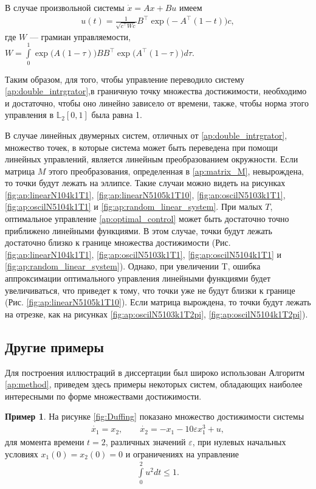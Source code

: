 \documentclass[../main.tex]{subfiles}
\begin{document}
  В случае произвольной системы $\dot{x} =Ax + Bu$ имеем
  \begin{gather}\label{ap:optimal_control}
  	u(t) = \frac{1}{\sqrt{c^{\top}Wc}} B^{\top} \operatorname{exp}\big(-A^{\top}(1-t)\big) c,
  \end{gather}
  где $W$ --- грамиан управляемости, $W  = \int\limits_{0}^{1}  \operatorname{exp}\big(A(1-\tau)\big) B B^{\top}  \operatorname{exp}\big(A^{\top}(1-\tau)\big) d\tau$.
  
  Таким образом, для того, чтобы управление переводило систему  \eqref{ap:double_intrgrator},в граничную точку множества достижимости, необходимо и достаточно, чтобы оно линейно зависело от времени, также, чтобы норма этого управления в $\mathbb{L}_2[0,1]$ была равна 1. 
  
  В случае линейных двумерных систем, отличных от  \eqref{ap:double_intrgrator}, множество точек, в которые система может быть переведена при помощи линейных управлений, является линейным преобразованием окружности.
  Если матрица $M$ этого преобразования, определенная в \eqref{ap:matrix_M}, невырождена, то точки будут лежать на эллипсе. 
  Такие случаи можно видеть на рисунках  \ref{fig:ap:linearN104k1T1}, \ref{fig:ap:linearN5105k1T10}, \ref{fig:ap:oscilN5103k1T1}, \ref{fig:ap:oscilN5104k1T1} и \ref{fig:ap:random_linear_system}.
  При малых $T$, оптимальное управление \eqref{ap:optimal_control} может быть достаточно точно приближено линейными функциями. 
  В этом случае, точки будут лежать достаточно близко к границе множества достижимости (Рис. \ref{fig:ap:linearN104k1T1}, \ref{fig:ap:oscilN5103k1T1}, \ref{fig:ap:oscilN5104k1T1} и \ref{fig:ap:random_linear_system}).
  Однако, при увеличении T, ошибка аппроксимации оптимального управления линейными функциями будет увеличиваться, что приведет к тому, что точки уже не будут близки к границе (Рис. \ref{fig:ap:linearN5105k1T10}). 
  Если матрица вырождена, то точки будут лежать на отрезке, как на рисунках \ref{fig:ap:oscilN5103k1T2pi}, \ref{fig:ap:oscilN5104k1T2pi}).
  
  \subsection{Другие примеры}
  
  Для построения иллюстраций в диссертации был широко использован Алгоритм \ref{ap:method}, приведем здесь примеры некоторых систем, обладающих наиболее интересными по форме множествами достижимости.
   
   \textbf{Пример 1}. На рисунке \ref{fig:Duffing} показано множество достижимости системы 
   \begin{gather}\label{ap:Duffing}
   	\dot{x_1} = x_2, \qquad
   	\dot{x_2} = -x_1 - 10 \varepsilon x_1^3 + u ,
   \end{gather}
   для момента времени $t = 2$, различных значений $\varepsilon$, при нулевых начальных условиях $x_1(0) = x_2(0) = 0 $ и ограничениях на управление 
   \begin{gather}\label{ap:Duffing_controls}
   	\int\limits_0^2u^2dt \leqslant 1.
   \end{gather}
   	   
\end{document}
